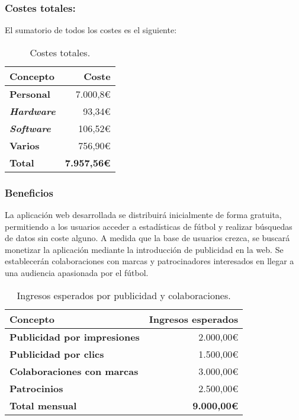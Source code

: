\subsubsection{Costes totales:}
El sumatorio de todos los costes es el siguiente:
\begin{table}[h!]
    \centering
    \begin{tabular}{>{\bfseries}l r}
        \toprule
        \textbf{Concepto} & \textbf{Coste} \\
        \midrule
        Personal & 7.000,8€ \\
        \emph{Hardware} & 93,34€ \\
        \emph{Software} & 106,52€ \\
        Varios & 756,90€ \\
        \midrule
        \textbf{Total} & \textbf{7.957,56€} \\
        \bottomrule
    \end{tabular}
    \caption{Costes totales.}
    \label{tabla:costes_totales}
\end{table}
\subsubsection{Beneficios}
La aplicación web desarrollada se distribuirá inicialmente de forma gratuita, permitiendo a los usuarios acceder a estadísticas de fútbol y realizar búsquedas de datos sin coste alguno. A medida que la base de usuarios crezca, se buscará monetizar la aplicación mediante la introducción de publicidad en la web. Se establecerán colaboraciones con marcas y patrocinadores interesados en llegar a una audiencia apasionada por el fútbol.
\begin{table}[h!]
    \centering
    \begin{tabular}{>{\bfseries}l r}
        \toprule
        \textbf{Concepto} & \textbf{Ingresos esperados} \\
        \midrule
        Publicidad por impresiones & 2.000,00€ \\
        Publicidad por clics & 1.500,00€ \\
        Colaboraciones con marcas & 3.000,00€ \\
        Patrocinios & 2.500,00€ \\
        \midrule
        \textbf{Total mensual} & \textbf{9.000,00€} \\
        \bottomrule
    \end{tabular}
    \caption{Ingresos esperados por publicidad y colaboraciones.}
    \label{tabla:ingresos_publicidad}
\end{table}
